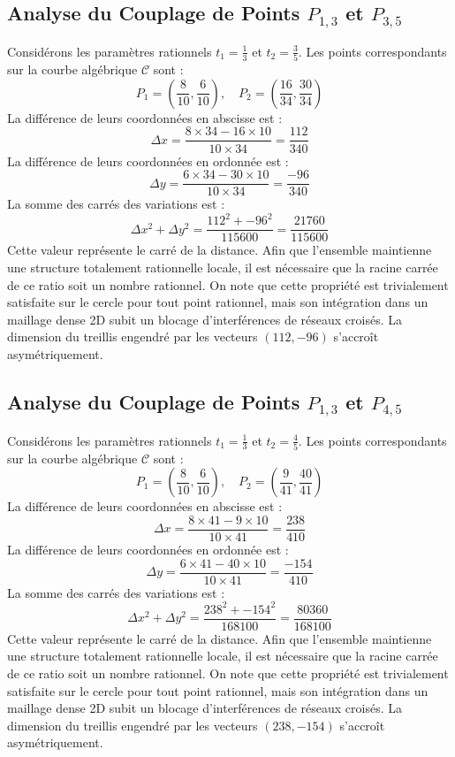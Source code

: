 \documentclass[12pt, a4paper]{article}
\begin{document}
\subsection{Analyse du Couplage de Points $P_{1,3}$ et $P_{3,5}$}
Considérons les paramètres rationnels $t_1 = \frac{1}{3}$ et $t_2 = \frac{3}{5}$.
Les points correspondants sur la courbe algébrique $\mathcal{C}$ sont :
$$ P_1 = \left( \frac{8}{10}, \frac{6}{10} \right), \quad P_2 = \left( \frac{16}{34}, \frac{30}{34} \right) $$
La différence de leurs coordonnées en abscisse est :
$$ \Delta x = \frac{8 \times 34 - 16 \times 10}{10 \times 34} = \frac{112}{340} $$
La différence de leurs coordonnées en ordonnée est :
$$ \Delta y = \frac{6 \times 34 - 30 \times 10}{10 \times 34} = \frac{-96}{340} $$
La somme des carrés des variations est :
$$ \Delta x^2 + \Delta y^2 = \frac{ 112^2 + -96^2 }{ 115600 } = \frac{ 21760 }{ 115600 } $$
Cette valeur représente le carré de la distance. Afin que l'ensemble maintienne une structure totalement rationnelle locale, il est nécessaire que la racine carrée de ce ratio soit un nombre rationnel. On note que cette propriété est trivialement satisfaite sur le cercle pour tout point rationnel, mais son intégration dans un maillage dense 2D subit un blocage d'interférences de réseaux croisés. La dimension du treillis engendré par les vecteurs $( 112, -96 )$ s'accroît asymétriquement.


\subsection{Analyse du Couplage de Points $P_{1,3}$ et $P_{4,5}$}
Considérons les paramètres rationnels $t_1 = \frac{1}{3}$ et $t_2 = \frac{4}{5}$.
Les points correspondants sur la courbe algébrique $\mathcal{C}$ sont :
$$ P_1 = \left( \frac{8}{10}, \frac{6}{10} \right), \quad P_2 = \left( \frac{9}{41}, \frac{40}{41} \right) $$
La différence de leurs coordonnées en abscisse est :
$$ \Delta x = \frac{8 \times 41 - 9 \times 10}{10 \times 41} = \frac{238}{410} $$
La différence de leurs coordonnées en ordonnée est :
$$ \Delta y = \frac{6 \times 41 - 40 \times 10}{10 \times 41} = \frac{-154}{410} $$
La somme des carrés des variations est :
$$ \Delta x^2 + \Delta y^2 = \frac{ 238^2 + -154^2 }{ 168100 } = \frac{ 80360 }{ 168100 } $$
Cette valeur représente le carré de la distance. Afin que l'ensemble maintienne une structure totalement rationnelle locale, il est nécessaire que la racine carrée de ce ratio soit un nombre rationnel. On note que cette propriété est trivialement satisfaite sur le cercle pour tout point rationnel, mais son intégration dans un maillage dense 2D subit un blocage d'interférences de réseaux croisés. La dimension du treillis engendré par les vecteurs $( 238, -154 )$ s'accroît asymétriquement.
\end{document}
